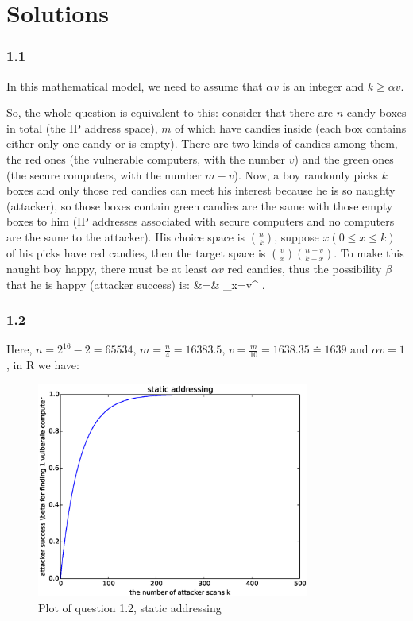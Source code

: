 \documentclass[10pt]{article}
\begin{document}
\section*{Solutions}
\subsubsection*{1.1}

In this mathematical model, we need to assume that $\alpha v$ is an integer and $ k \geq \alpha v$.

\noindent So, the whole question is equivalent to this: consider that there are $n$ candy boxes in total (the IP address space), $m$ of which have candies inside (each box contains either only one candy or is empty). There are two kinds of candies among them, the red ones (the vulnerable computers, with the number $v$) and the green ones (the secure computers, with the number $m-v$). Now, a boy randomly picks $k$ boxes and only those red candies can meet his interest because he is so naughty (attacker), so those boxes contain green candies are the same with those empty boxes to him (IP addresses associated with secure computers and no computers are the same to the attacker). His choice space is $n \choose k$, suppose $x (0 \leq x \leq k)$ of his picks have red candies, then the target space is $v \choose x$$ n-v \choose k-x$. To make this naught boy happy, there must be at least $\alpha v$ red candies, thus the possibility $\beta$ that he is happy (attacker success) is:
\beq
\beta &=& \sum\limits_{x=\alpha v}^{} . \nonumber
\eeq

\subsubsection*{1.2}
Here, $n = 2^{16}-2 = 65534$, $m=\frac{n}{4} = 16383.5$, $v = \frac{m}{10} = 1638.35 \doteq 1639 $ and $\alpha v = 1$, in R we have:

\begin{figure}[H]
\begin{center}
\includegraphics[width=0.8\textwidth]{figure1.2.eps}
\caption{Plot of question 1.2, static addressing}
\end{center}
\end{figure}
\end{document}
